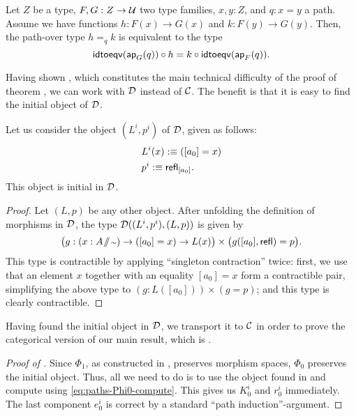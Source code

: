 \begin{lemma}\label{lem:paths-aux-lemma-function-eq}
Let $Z$ be a type, $F, G : Z \to \mathcal{U}$ two type families, $x, y : Z$,
and $q : x = y$ a path.
Assume we have functions $h : F(x) \to G(x)$ and $k : F(y) \to G(y)$.
Then, the path-over type $h =_q k$ is equivalent to the type
 \begin{equation*}
  \mathsf{idtoeqv}(\mathsf{ap}_G(q)) \circ h = k \circ \mathsf{idtoeqv}(\mathsf{ap}_F(q)).  
 \end{equation*}
\end{lemma}

Having shown , which constitutes the main
technical difficulty of the proof of theorem ,
we can work with $\mathcal D$ instead of $\mathcal C$.
The benefit is that it is easy to find the initial object of $\mathcal D$.

\begin{lemma} \label{lem:paths-D0-init}
 Let us consider the object $(L^i,p^i)$ of $\mathcal D$, given as follows:
 \begin{align*}
  & L^i(x) :\equiv ([a_0] = x) \\
  & p^i :\equiv \mathsf{refl}_{[a_0]}.
 \end{align*}
 This object is initial in $\mathcal D$.
\end{lemma}
\begin{proof}
 Let $(L,p)$ be any other object.
 After unfolding the definition of morphisms in $\mathcal D$, 
 the type $\mathcal D((L^i,p^i),(L,p))$ is given by
 \begin{equation*}
  \big(g : (x : A \! \sslash \! {\scriptstyle \sim}) \to ([a_0] = x) \to L(x)\big) \times
   \big(g([a_0], \mathsf{refl}) = p \big) \text{.}
 \end{equation*}
This type is contractible by applying ``singleton contraction'' twice:
first, we use that an element $x$ together with an equality $[a_0] = x$
form a contractible pair, simplifying the above type to $(g : L([a_0])) \times (g = p)$;
and this type is clearly contractible.
\end{proof}

Having found the initial object in $\mathcal D$, we transport it to $\mathcal C$ in order
to prove the categorical version of our main result, which is .
\begin{proof}[Proof of ]
Since $\Phi_1$, as constructed in , preserves
morphism spaces, $\Phi_0$ preserves the initial object.
Thus, all we need to do is to use the object found in 
and compute using \eqref{eq:paths-Phi0-compute}.
 This gives us $K_0^i$ and $r_0^i$ immediately.
 The last component $e_0^i$ is correct by a standard ``path induction''-argument.
\end{proof}

